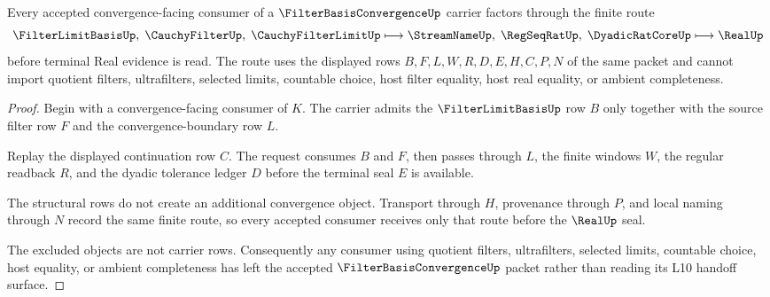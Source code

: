 \begin{theorem}
\label{thm:filter-basis-convergence-l10-handoff}
Every accepted convergence-facing consumer of a $\FilterBasisConvergenceUp$ carrier factors through the finite route
$$
\FilterLimitBasisUp,\;\CauchyFilterUp,\;\CauchyFilterLimitUp
\longmapsto
\StreamNameUp,\;\RegSeqRatUp,\;\DyadicRatCoreUp
\longmapsto
\RealUp
$$
before terminal Real evidence is read. The route uses the displayed rows $B,F,L,W,R,D,E,H,C,P,N$ of the same packet and cannot import quotient filters, ultrafilters, selected limits, countable choice, host filter equality, host real equality, or ambient completeness.
\end{theorem}
\begin{proof}
Begin with a convergence-facing consumer of $K$. The carrier admits the $\FilterLimitBasisUp$ row $B$ only together with the source filter row $F$ and the convergence-boundary row $L$.

Replay the displayed continuation row $C$. The request consumes $B$ and $F$, then passes through $L$, the finite windows $W$, the regular readback $R$, and the dyadic tolerance ledger $D$ before the terminal seal $E$ is available.

The structural rows do not create an additional convergence object. Transport through $H$, provenance through $P$, and local naming through $N$ record the same finite route, so every accepted consumer receives only that route before the $\RealUp$ seal.

The excluded objects are not carrier rows. Consequently any consumer using quotient filters, ultrafilters, selected limits, countable choice, host equality, or ambient completeness has left the accepted $\FilterBasisConvergenceUp$ packet rather than reading its L10 handoff surface.
\end{proof}




